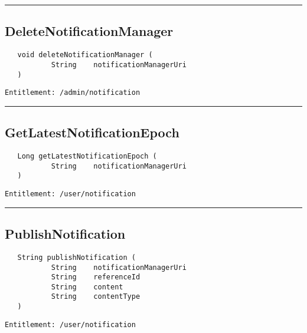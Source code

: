 \rule{12cm}{2pt}
\subsection{DeleteNotificationManager}
\label{Api:DeleteNotificationManager}
\begin{Verbatim}
   void deleteNotificationManager (
           String    notificationManagerUri
   )
\end{Verbatim}
\begin{Verbatim}[formatcom=\color{Maroon}]
  Entitlement: /admin/notification
\end{Verbatim}



\rule{12cm}{2pt}
\subsection{GetLatestNotificationEpoch}
\label{Api:GetLatestNotificationEpoch}
\begin{Verbatim}
   Long getLatestNotificationEpoch (
           String    notificationManagerUri
   )
\end{Verbatim}
\begin{Verbatim}[formatcom=\color{Maroon}]
  Entitlement: /user/notification
\end{Verbatim}



\rule{12cm}{2pt}
\subsection{PublishNotification}
\label{Api:PublishNotification}
\begin{Verbatim}
   String publishNotification (
           String    notificationManagerUri
           String    referenceId
           String    content
           String    contentType
   )
\end{Verbatim}
\begin{Verbatim}[formatcom=\color{Maroon}]
  Entitlement: /user/notification
\end{Verbatim}



